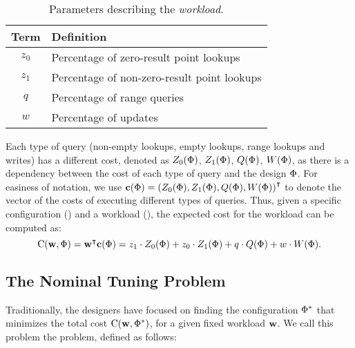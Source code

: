 \begin{table}[h]\centering%
\renewcommand{\arraystretch}{1.1}
\begin{tabular}{cl}
    \toprule
    Term & Definition \\
    \midrule
        $z_0$ & Percentage of zero-result point lookups\\ %
        $z_1$ & Percentage of non-zero-result point lookups\\ %
        $q$ & Percentage of range queries\\ %
        $w$ & Percentage of updates\\ %
    \bottomrule
\end{tabular}
\caption{Parameters describing the \emph{workload}.}
    \label{tab:workload-params}	
\end{table}

\noindent Each type of query (non-empty lookups, empty lookups, range lookups and writes) has a different cost, denoted as
$Z_0({{\Phi}})$, $Z_1({{\Phi}})$, $Q({{\Phi}})$, $W({{\Phi}})$, as there is a dependency between
the cost of each type of query and the design ${{{\Phi}}}$.
For easiness of notation, we use 
    ${{\bf{c}}}({{\Phi}}) = \left(Z_0({{\Phi}}), Z_1({{\Phi}}), Q({{\Phi}}), W({{\Phi}})\right)^\intercal$ 
    to denote the vector of the costs  of executing
    different types of queries.
Thus, given a specific configuration ({\configuration}) and a workload ({\workload}),
    the expected cost for the workload can be computed as:
{%
\begin{equation}
    \label{eq:thecost}
    {{\ensuremath{\text{C}}}}({{\bf{w}}}, {{\Phi}}) = {{\bf{w}}}^\intercal
    {{\ensuremath{\bf{c}}}}({{\Phi}})={{z_1}} \cdot
    Z_0({{\Phi}})+{{z_0}} \cdot Z_1({{\Phi}}) + {{q}}\cdot Q({{\Phi}}) + {{w}} \cdot W({{\Phi}}).
\end{equation}
}%

\subsection{The Nominal Tuning Problem}
Traditionally, the designers have focused on finding the 
configuration ${{{\Phi}}}^\ast$ that minimizes the total cost %
${{\text{C}}}({{\bf{w}}}, {{\Phi}}^\ast)$,
 for a given fixed workload ${{\bf{w}}}$.  We call this problem the
 {\nominal} problem, defined as follows:
 

